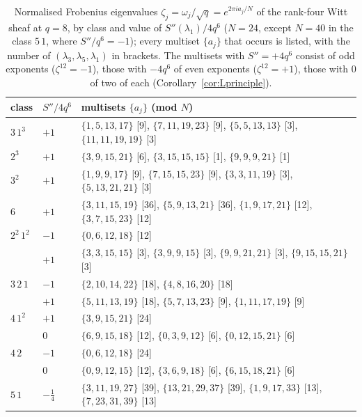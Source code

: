 ﻿\documentclass[12pt,a4paper]{amsart}
\theoremstyle{definition}
\newcommand{\Spp}{S''}
\begin{document}
\begin{table}[H]
\centering
\caption{Normalised Frobenius eigenvalues $\zeta_j=\omega_j/\sqrt q=e^{2\pi ia_j/N}$ of the rank-four Witt sheaf at $q=8$, by class and value of $\Spp(\lambda_1)/4q^6$ ($N=24$, except $N=40$ in the class $5\,1$, where $\Spp/q^6=-1$); every multiset $\{a_j\}$ that occurs is listed, with the number of $(\lambda_3,\lambda_5,\lambda_1)$ in brackets. The multisets with $\Spp=+4q^6$ consist of odd exponents ($\zeta^{12}=-1$), those with $-4q^6$ of even exponents ($\zeta^{12}=+1$), those with $0$ of two of each (Corollary~\ref{cor:Lprinciple}).}\label{tab:eigen}
\small
\begin{tabular}{@{}lll@{}}
\toprule
class & $\Spp/4q^6$ & multisets $\{a_j\}$ (mod $N$)\\
\midrule
$3\,1^3$ & $+1$ & $\{1,5,13,17\}$ [9], $\{7,11,19,23\}$ [9], $\{5,5,13,13\}$ [3], $\{11,11,19,19\}$ [3]\\
$2^3$ & $+1$ & $\{3,9,15,21\}$ [6], $\{3,15,15,15\}$ [1], $\{9,9,9,21\}$ [1]\\
$3^2$ & $+1$ & $\{1,9,9,17\}$ [9], $\{7,15,15,23\}$ [9], $\{3,3,11,19\}$ [3], $\{5,13,21,21\}$ [3]\\
$6$ & $+1$ & $\{3,11,15,19\}$ [36], $\{5,9,13,21\}$ [36], $\{1,9,17,21\}$ [12], $\{3,7,15,23\}$ [12]\\
$2^2\,1^2$ & $-1$ & $\{0,6,12,18\}$ [12]\\
 & $+1$ & $\{3,3,15,15\}$ [3], $\{3,9,9,15\}$ [3], $\{9,9,21,21\}$ [3], $\{9,15,15,21\}$ [3]\\
$3\,2\,1$ & $-1$ & $\{2,10,14,22\}$ [18], $\{4,8,16,20\}$ [18]\\
 & $+1$ & $\{5,11,13,19\}$ [18], $\{5,7,13,23\}$ [9], $\{1,11,17,19\}$ [9]\\
$4\,1^2$ & $+1$ & $\{3,9,15,21\}$ [24]\\
 & $0$ & $\{6,9,15,18\}$ [12], $\{0,3,9,12\}$ [6], $\{0,12,15,21\}$ [6]\\
$4\,2$ & $-1$ & $\{0,6,12,18\}$ [24]\\
 & $0$ & $\{0,9,12,15\}$ [12], $\{3,6,9,18\}$ [6], $\{6,15,18,21\}$ [6]\\
$5\,1$ & $-\tfrac14$ & $\{3,11,19,27\}$ [39], $\{13,21,29,37\}$ [39], $\{1,9,17,33\}$ [13], $\{7,23,31,39\}$ [13]\\
\bottomrule
\end{tabular}
\end{table}
\end{document}
